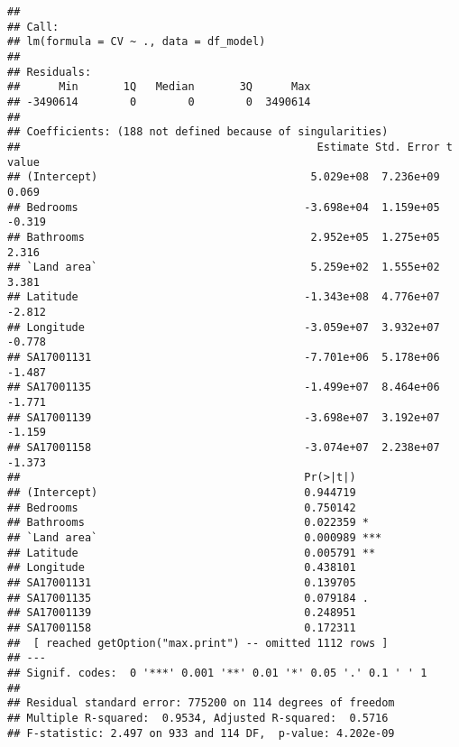 \documentclass[
]{article}
\begin{document}
\begin{verbatim}
## 
## Call:
## lm(formula = CV ~ ., data = df_model)
## 
## Residuals:
##      Min       1Q   Median       3Q      Max 
## -3490614        0        0        0  3490614 
## 
## Coefficients: (188 not defined because of singularities)
##                                              Estimate Std. Error t value
## (Intercept)                                 5.029e+08  7.236e+09   0.069
## Bedrooms                                   -3.698e+04  1.159e+05  -0.319
## Bathrooms                                   2.952e+05  1.275e+05   2.316
## `Land area`                                 5.259e+02  1.555e+02   3.381
## Latitude                                   -1.343e+08  4.776e+07  -2.812
## Longitude                                  -3.059e+07  3.932e+07  -0.778
## SA17001131                                 -7.701e+06  5.178e+06  -1.487
## SA17001135                                 -1.499e+07  8.464e+06  -1.771
## SA17001139                                 -3.698e+07  3.192e+07  -1.159
## SA17001158                                 -3.074e+07  2.238e+07  -1.373
##                                            Pr(>|t|)    
## (Intercept)                                0.944719    
## Bedrooms                                   0.750142    
## Bathrooms                                  0.022359 *  
## `Land area`                                0.000989 ***
## Latitude                                   0.005791 ** 
## Longitude                                  0.438101    
## SA17001131                                 0.139705    
## SA17001135                                 0.079184 .  
## SA17001139                                 0.248951    
## SA17001158                                 0.172311    
##  [ reached getOption("max.print") -- omitted 1112 rows ]
## ---
## Signif. codes:  0 '***' 0.001 '**' 0.01 '*' 0.05 '.' 0.1 ' ' 1
## 
## Residual standard error: 775200 on 114 degrees of freedom
## Multiple R-squared:  0.9534, Adjusted R-squared:  0.5716 
## F-statistic: 2.497 on 933 and 114 DF,  p-value: 4.202e-09
\end{verbatim}
\end{document}

